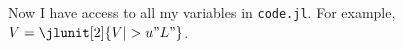 \documentclass{article}
\begin{document}
    Now I have access to all my variables in \texttt{code.jl}. 
    For example, $ V = \jlunit[2]{V |> u"L"} $.
\end{document}
